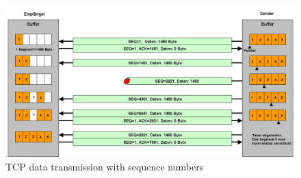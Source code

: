 \begin{figure}[h]
      \centering
      \includegraphics[width=\textwidth]{gfx/Tcp_transfer.png}
      \caption{TCP data transmission with sequence numbers}
      \label{fig:tcp_data_transmission}
\end{figure}